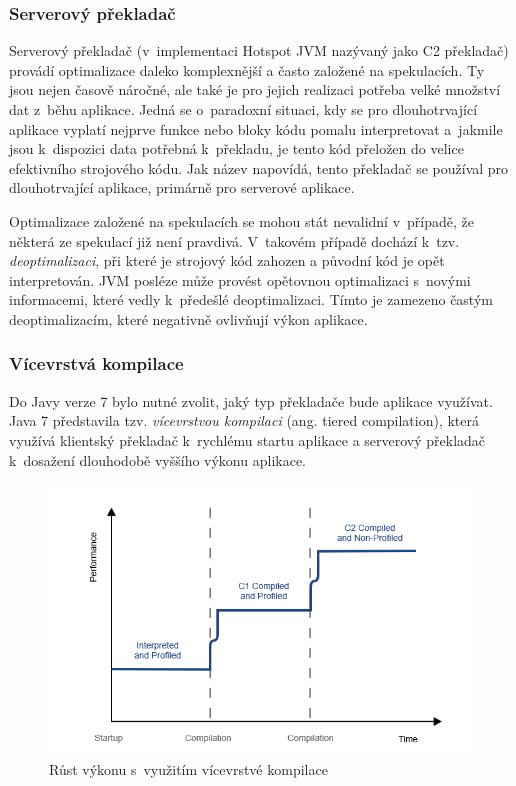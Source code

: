 \documentclass[
  master,
  biblatex,
  figures=true,
  theorems,
  sourcecodes,
  glossaries,
  index
]{kidiplom}
\begin{document}
\subsubsection{Serverový překladač}
\label{server-compiler}
Serverový překladač (v~implementaci Hotspot JVM nazývaný jako C2 překladač) provádí optimalizace daleko komplexnější a často založené na spekulacích. Ty jsou nejen časově náročné, ale také je pro jejich realizaci potřeba velké množství dat z~běhu aplikace. Jedná se o~paradoxní situaci, kdy se pro dlouhotrvající aplikace vyplatí nejprve funkce nebo bloky kódu pomalu interpretovat a~jakmile jsou k~dispozici data potřebná k~překladu, je tento kód přeložen do velice efektivního strojového kódu. Jak název napovídá, tento překladač se používal pro dlouhotrvající aplikace, primárně pro serverové aplikace. \cite{spravce-pameti}

Optimalizace založené na spekulacích se mohou stát nevalidní v~případě, že některá ze spekulací již není pravdivá. V~takovém případě dochází k~tzv. \textit{deoptimalizaci}, při které je strojový kód zahozen a původní kód je opět interpretován. JVM posléze může provést opětovnou optimalizaci s~novými informacemi, které vedly k~předešlé deoptimalizaci. Tímto je zamezeno častým deoptimalizacím, které negativně ovlivňují výkon aplikace. 


\subsubsection{Vícevrstvá kompilace}
Do Javy verze 7 bylo nutné zvolit, jaký typ překladače bude aplikace využívat. Java 7 představila tzv. \textit{vícevrstvou kompilaci} (ang. tiered compilation), která využívá klientský překladač k~rychlému startu aplikace a serverový překladač k~dosažení dlouhodobě vyššího výkonu aplikace. 

\begin{figure} [h]
    \centering
    \includegraphics[width= 1\textwidth]{images/tiered-compilation.jpeg}
    \caption{Růst výkonu s~využitím vícevrstvé kompilace \cite{tiered-compilation}}
    \label{fig:tiered-compilation scheme}
\end{figure}
\end{document}

